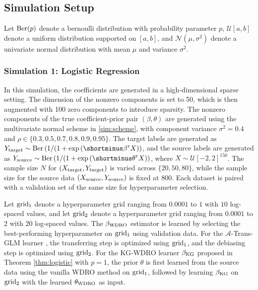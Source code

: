 \documentclass[12pt]{article}
\begin{document}
\subsection{Simulation Setup}
Let ${\rm Ber}(p)$ denote a bernoulli distribution with probability parameter $p$, $\mathcal{U}[a,b]$ denote a uniform distribution supported on $[a,b]$, and $\mathcal{N}(\mu,\sigma^2)$ denote a univariate normal distribution with mean $\mu$ and variance $\sigma^2$.

\subsubsection{Simulation 1: Logistic Regression}  
In this simulation, the coefficients are generated in a high-dimensional sparse setting. The dimension of the nonzero components is set to 50, which is then augmented with 100 zero components to introduce sparsity. The nonzero components of the true coefficient-prior pair $(\beta, \theta)$ are generated using the multivariate normal scheme in \eqref{sim:scheme}, with component variance $\sigma^2 = 0.4$ and $\rho \in \{0.3, 0.5, 0.7, 0.8, 0.9, 0.95\}$. The target labels are generated as $Y_{\rm target} \sim {\rm Ber}\left( 1/(1+\exp{(\shortminus\beta\trans X)} \right)$, and the source labels are generated as $Y_{\rm source} \sim  {\rm Ber}\left( 1/(1+\exp{(\shortminus \theta\trans X)} \right)$, where $X \sim \mathcal{U}[-2, 2]^{150}$. The sample size $N$ for $(X_{\rm target}, Y_{\rm target})$ is varied across $\{20, 50, 80\}$, while the sample size for the source data $(X_{\rm source}, Y_{\rm source})$ is fixed at 800. Each dataset is paired with a validation set of the same size for hyperparameter selection.

Let $\rm grid_1$ denote a hyperparameter grid ranging from $0.0001$ to $1$ with $10$ log-spaced values, and let $\rm grid_2$ denote a hyperparameter grid ranging from $0.0001$ to $2$ with $20$ log-spaced values. The $\beta_{\rm WDRO}$ estimator is learned by selecting the best-performing hyperparameter on $\rm grid_1$ using validation data. For the $\mathcal{A}$-Trans-GLM learner \citep[Algorithm 1]{tian2023transglm}, the transferring step is optimized using $\rm grid_1$, and the debiasing step is optimized using $\rm grid_2$. For the KG-WDRO learner $\beta_{\rm KG}$ proposed in Theorem \ref{thm:logistic} with $p=1$, the prior $\theta$ is first learned from the source data using the vanilla WDRO method on $\rm grid_1$, followed by learning $\beta_{\rm KG}$ on $\rm grid_2$ with the learned $\theta_{\rm WDRO}$ as input.
\end{document}
